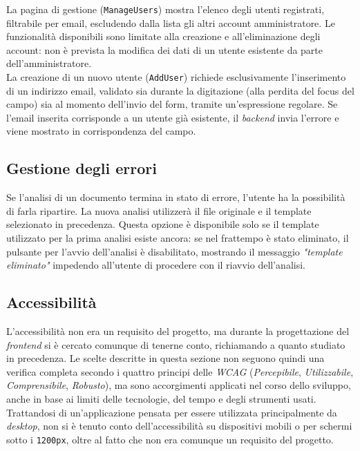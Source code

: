 La pagina di gestione (\texttt{ManageUsers}) mostra l'elenco degli utenti registrati, filtrabile per email, escludendo dalla lista gli altri account amministratore. Le funzionalità disponibili sono limitate alla creazione e all'eliminazione degli account: non è prevista la modifica dei dati di un utente esistente da parte dell'amministratore.\\

La creazione di un nuovo utente (\texttt{AddUser}) richiede esclusivamente l'inserimento di un indirizzo email, validato sia durante la digitazione (alla perdita del focus del campo) sia al momento dell'invio del form, tramite un'espressione regolare. Se l'email inserita corrisponde a un utente già esistente, il \emph{backend} invia l'errore e viene mostrato in corrispondenza del campo.

\subsection{Gestione degli errori}
Se l'analisi di un documento termina in stato di errore, l'utente ha la possibilità di farla ripartire. La nuova analisi utilizzerà il file originale e il template selezionato in precedenza. 
Questa opzione è disponibile solo se il template utilizzato per la prima analisi esiste ancora: se nel frattempo è stato eliminato, il pulsante per l'avvio dell'analisi è disabilitato, mostrando il messaggio \emph{"template eliminato"} impedendo all'utente di procedere con il riavvio dell'analisi.

\subsection{Accessibilità}
L'accessibilità non era un requisito del progetto, ma durante la progettazione del \emph{frontend} si è cercato comunque di tenerne conto, richiamando a quanto studiato in precedenza. Le scelte descritte in questa sezione non seguono quindi una verifica completa secondo i quattro principi delle \emph{WCAG} (\emph{Percepibile}, \emph{Utilizzabile}, \emph{Comprensibile}, \emph{Robusto}), ma sono accorgimenti applicati nel corso dello sviluppo, anche in base ai limiti delle tecnologie, del tempo e degli strumenti usati. Trattandosi di un'applicazione pensata per essere utilizzata principalmente da \emph{desktop}, non si è tenuto conto dell'accessibilità su dispositivi mobili o per schermi sotto i \texttt{1200px}, oltre al fatto che non era comunque un requisito del progetto.

